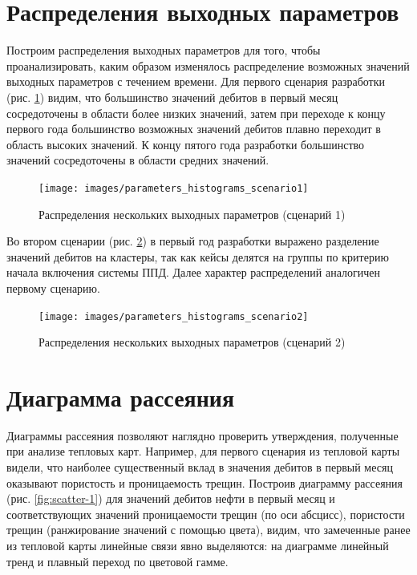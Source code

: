 \section{Распределения выходных параметров} \label{ch1:sec2}
Построим распределения выходных параметров для того, чтобы проанализировать, каким образом изменялось распределение возможных значений выходных параметров с течением времени. Для первого сценария разработки (рис. \ref{fig:histograms-1}) видим, что большинство значений дебитов в первый месяц сосредоточены в области более низких значений, затем при переходе к концу первого года большинство возможных значений дебитов плавно переходит в область высоких значений. К концу пятого года разработки большинство значений сосредоточены в области средних значений.

\begin{figure}[H] 
	\center
	\texttt{[image: images/parameters\_histograms\_scenario1]}
	\caption{Распределения нескольких выходных параметров (сценарий 1)} 
	\label{fig:histograms-1}
\end{figure}

Во втором сценарии (рис. \ref{fig:histograms-2}) в первый год разработки выражено разделение значений дебитов на кластеры, так как кейсы делятся на группы по критерию начала включения системы ППД. Далее характер распределений аналогичен первому сценарию.

\begin{figure}[H] 
	\center
	\texttt{[image: images/parameters\_histograms\_scenario2]}
	\caption{Распределения нескольких выходных параметров (сценарий 2)} 
	\label{fig:histograms-2}
\end{figure}



\section{Диаграмма рассеяния} \label{ch1:sec3}
Диаграммы рассеяния позволяют наглядно проверить утверждения, полученные при анализе тепловых карт. Например, для первого сценария из тепловой карты видели, что наиболее существенный вклад в значения дебитов в первый месяц оказывают пористость и проницаемость трещин.
Построив диаграмму рассеяния (рис. \ref{fig:scatter-1}) для значений дебитов нефти в первый месяц и соответствующих значений проницаемости трещин (по оси абсцисс), пористости трещин (ранжирование значений с помощью цвета), видим, что замеченные ранее из тепловой карты линейные связи явно выделяются: на диаграмме линейный тренд и плавный переход по цветовой гамме.


